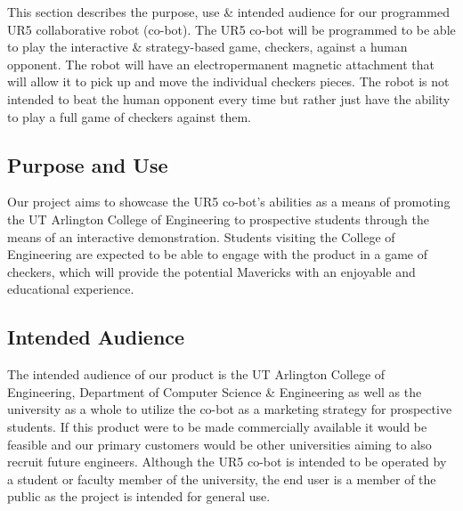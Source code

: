 This section describes the purpose, use \& intended audience for our programmed UR5 collaborative robot (co-bot). The UR5 co-bot will be programmed to be able to play the interactive \& strategy-based game, checkers, against a human opponent. The robot will have an electropermanent magnetic attachment that will allow it to pick up and move the individual checkers pieces. The robot is not intended to beat the human opponent every time but rather just have the ability to play a full game of checkers against them.

\subsection{Purpose and Use}

Our project aims to showcase the UR5 co-bot's abilities as a means of promoting the UT Arlington College of Engineering to prospective students through the means of an interactive demonstration. Students visiting the College of Engineering are expected to be able to engage with the product in a game of checkers, which will provide the potential Mavericks with an enjoyable and educational experience.

\subsection{Intended Audience}

The intended audience of our product is the UT Arlington College of Engineering, Department of Computer Science \& Engineering as well as the university as a whole to utilize the co-bot as a marketing strategy for prospective students. If this product were to be made commercially available it would be feasible and our primary customers would be other universities aiming to also recruit future engineers. Although the UR5 co-bot is intended to be operated by a student or faculty member of the university, the end user is a member of the public as the project is intended for general use.

